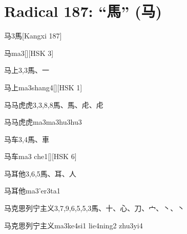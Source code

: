 
\section*{Radical 187: ``⾺'' (马)}

\begin{Entry}{马}{3}{⾺}[Kangxi 187]
  \begin{Phonetics}{马}{ma3}[][HSK 3]
  \end{Phonetics}
\end{Entry}

\begin{Entry}{马上}{3,3}{⾺、⼀}
  \begin{Phonetics}{马上}{ma3shang4}[][HSK 1]
  \end{Phonetics}
\end{Entry}

\begin{Entry}{马马虎虎}{3,3,8,8}{⾺、⾺、⾌、⾌}
  \begin{Phonetics}{马马虎虎}{ma3ma3hu3hu3}
  \end{Phonetics}
\end{Entry}

\begin{Entry}{马车}{3,4}{⾺、⾞}
  \begin{Phonetics}{马车}{ma3 che1}[][HSK 6]
  \end{Phonetics}
\end{Entry}

\begin{Entry}{马耳他}{3,6,5}{⾺、⽿、⼈}
  \begin{Phonetics}{马耳他}{ma3'er3ta1}
  \end{Phonetics}
\end{Entry}

\begin{Entry}{马克思列宁主义}{3,7,9,6,5,5,3}{⾺、⼗、⼼、⼑、⼧、⼂、⼂}
  \begin{Phonetics}{马克思列宁主义}{ma3ke4si1 lie4ning2 zhu3yi4}
  \end{Phonetics}
\end{Entry}

